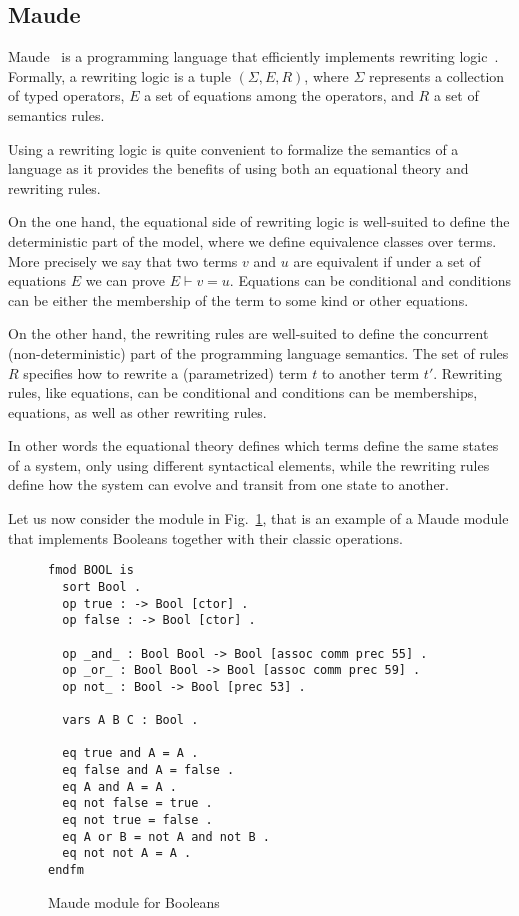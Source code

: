\documentclass{article}[12pt,a4paper]
\theoremstyle{definition}
\begin{document}

\subsection{Maude}\label{sec:maude}

Maude~\cite{maude} is a programming language that efficiently implements rewriting logic~\cite{MeseguerMS96}.
Formally, a rewriting logic is a tuple $(\Sigma, E, R)$, where $\Sigma$
represents a collection of typed operators, $E$ a set of equations among the operators, and $R$ a set of
semantics rules.

Using a rewriting logic is quite convenient to formalize the
semantics of a language as it provides the benefits of using both an equational theory and rewriting rules.

On the one hand, the equational side of rewriting logic is well-suited to define the deterministic part of the model, where
we define equivalence classes over terms. More precisely we say that two terms
$v$ and $u$ are equivalent if under a set of equations $E$ we can prove $E \vdash
v = u$. Equations can be conditional and conditions can be either the
membership of the term to some kind or other equations.

On the other hand, the rewriting rules are well-suited to define the
concurrent (non-deterministic) part of the programming language
semantics. The set of rules $R$ specifies how to rewrite a
(parametrized) term $t$ to another term $t'$.  Rewriting rules, like
equations, can be conditional and conditions can be
memberships, equations, as well as other rewriting rules.

In other words the equational theory defines which terms define the same states
of a system, only using different syntactical elements, while the rewriting rules
define how the system can evolve and transit from one state to another.

Let us now consider the module in Fig.~\ref{fig:bool}, that is an example of a Maude module that implements Booleans together with their classic operations.

\begin{figure}[t]
\begin{verbatim}
fmod BOOL is
  sort Bool .
  op true : -> Bool [ctor] .
  op false : -> Bool [ctor] .

  op _and_ : Bool Bool -> Bool [assoc comm prec 55] .
  op _or_ : Bool Bool -> Bool [assoc comm prec 59] .
  op not_ : Bool -> Bool [prec 53] .

  vars A B C : Bool .

  eq true and A = A .
  eq false and A = false .
  eq A and A = A .
  eq not false = true .
  eq not true = false .
  eq A or B = not A and not B .
  eq not not A = A .
endfm
\end{verbatim}
\caption{Maude module for Booleans}\label{fig:bool}
\end{figure}
\end{document}
